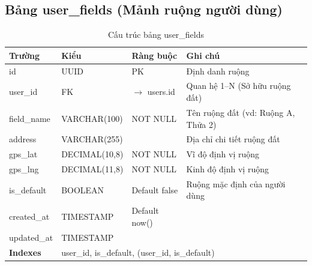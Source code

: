 \documentclass[12pt,a4paper]{article}
\begin{document}
\subsection{Bảng user\_fields (Mảnh ruộng người dùng)}
\begin{longtable}{|l|l|l|p{5.5cm}|}
    \caption{Cấu trúc bảng user\_fields}                                                                                                                  \\
    \hline
    \rowcolor{headerblue}
    \textbf{Trường}  & \textbf{Kiểu}                                                       & \textbf{Ràng buộc}     & \textbf{Ghi chú}                    \\
    \hline
    id               & UUID                                                                & PK                     & Định danh ruộng                     \\
    \hline
    user\_id         & FK                                                                  & $\rightarrow$ users.id & Quan hệ 1--N (Sở hữu ruộng đất)     \\
    \hline
    field\_name      & VARCHAR(100)                                                        & NOT NULL               & Tên ruộng đất (vd: Ruộng A, Thửa 2) \\
    \hline
    address          & VARCHAR(255)                                                        &                        & Địa chỉ chi tiết ruộng đất          \\
    \hline
    gps\_lat         & DECIMAL(10,8)                                                       & NOT NULL               & Vĩ độ định vị ruộng                 \\
    \hline
    gps\_lng         & DECIMAL(11,8)                                                       & NOT NULL               & Kinh độ định vị ruộng               \\
    \hline
    is\_default      & BOOLEAN                                                             & Default false          & Ruộng mặc định của người dùng       \\
    \hline
    created\_at      & TIMESTAMP                                                           & Default now()          &                                     \\
    \hline
    updated\_at      & TIMESTAMP                                                           &                        &                                     \\
    \hline
    \rowcolor{headerblue}
    \textbf{Indexes} & \multicolumn{3}{l|}{user\_id, is\_default, (user\_id, is\_default)}                                                                \\
    \hline
\end{longtable}
\end{document}
